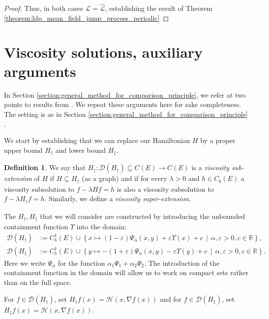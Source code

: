 \documentclass[a4paper]{article}
\newcommand{\cD}{\mathcal{D}}
\newcommand{\cH}{\mathcal{H}}
\newcommand{\cL}{\mathcal{L}}
\newcommand{\bR}{\mathbb{R}}
\numberwithin{equation}{section}
\theoremstyle{definition}
\newtheorem{definition}[theorem]{Definition}
\begin{document}
\begin{proof}
	Thus, in both cases $\cL = \widehat{\cL}$, establishing the result of Theorem \ref{theorem:ldp_mean_field_jump_process_periodic}
\end{proof}


\appendix

\section{Viscosity solutions, auxiliary arguments} \label{appendix:viscosity_solutions}

In Section \ref{section:general_method_for_comparison_principle}, we refer at two points to results from \cite{CoKr17}. We repeat these arguments here for sake completeness. The setting is as in Section \ref{section:general_method_for_comparison_principle} .

We start by establishing that we can replace our Hamiltonian $H$ by a proper upper bound $H_\dagger$ and lower bound $H_\ddagger$.

\begin{definition}
	We say that $H_\dagger : \cD(H_\dagger) \subseteq C(E) \rightarrow C(E)$ is a \textit{viscosity sub-extension} of $H$ if $H \subseteq H_\dagger$ (as a graph) and if for every $\lambda >0$ and $h \in C_b(E)$ a viscosity subsolution to $f-\lambda H f = h$ is also a viscosity subsolution to $f - \lambda H_\dagger f =h$. Similarly, we define a \textit{viscosity super-extension}.
\end{definition}

The $H_\dagger,H_\ddagger$ that we will consider are constructed by introducing the unbounded containment function $\Upsilon$ into the domain:
\begin{align*}
	\cD(H_\dagger) & := C^1_b(E) \cup \left\{x \mapsto  (1-\varepsilon)\Psi_\alpha(x,y) + \varepsilon \Upsilon(x) +c \, \middle| \, \alpha,\varepsilon > 0, c \in \bR \right\}, \\
	\cD(H_\ddagger) & := C^1_b(E) \cup \left\{y \mapsto - (1+\varepsilon)\Psi_\alpha(x,y) - \varepsilon \Upsilon(y) +c \, \middle| \, \alpha,\varepsilon > 0, c \in \bR \right\}.
\end{align*}
Here we write $\Psi_\alpha$ for the function $\alpha_1 \Psi_1 + \alpha_2 \Psi_2$. The introduction of the containment function in the domain will allow us to work on compact sets rather than on the full space.

For $f \in \cD(H_\dagger)$, set $H_\dagger f(x) = \cH(x,\nabla f(x))$ and for $f \in \cD(H_\ddagger)$, set $H_\ddagger f(x) = \cH(x,\nabla f(x))$.
\end{document}
